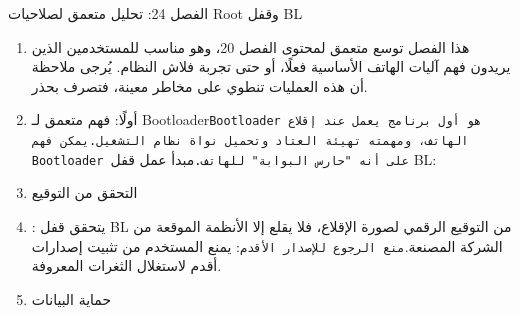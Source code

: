 \begin{tcbpractice}{الفصل 24: تحليل متعمق لصلاحيات Root وقفل BL}
\begin{enumerate}
  \item هذا الفصل توسع متعمق لمحتوى الفصل 20، وهو مناسب للمستخدمين الذين يريدون فهم آليات الهاتف الأساسية فعلًا، أو حتى تجربة فلاش النظام. يُرجى ملاحظة أن هذه العمليات تنطوي على مخاطر معينة، فتصرف بحذر.
  \item أولًا: فهم متعمق لـ Bootloader\texttt{Bootloader هو أول برنامج يعمل عند إقلاع الهاتف، ومهمته تهيئة العتاد وتحميل نواة نظام التشغيل.\allowbreak  يمكن فهم Bootloader على أنه "حارس البوابة" للهاتف.\allowbreak }مبدأ عمل قفل BL:
  \item التحقق من التوقيع
  \item : يتحقق قفل BL من التوقيع الرقمي لصورة الإقلاع، فلا يقلع إلا الأنظمة الموقعة من الشركة المصنعة.\texttt{منع الرجوع للإصدار الأقدم}: يمنع المستخدم من تثبيت إصدارات أقدم لاستغلال الثغرات المعروفة.
  \item حماية البيانات
\end{enumerate}

\end{tcbpractice}
